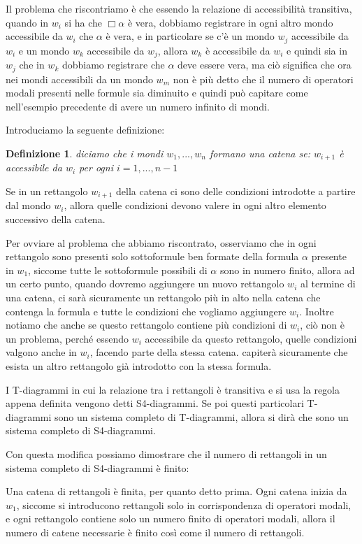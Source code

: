 \documentclass[a4paper, titlepage, 12pt]{report}
\newtheorem{definition}{Definizione}[chapter]
\begin{document}
Il problema che riscontriamo è che essendo la relazione di accessibilità transitiva,
quando in $w_i$ si ha che $\Box \alpha$ è vera, dobbiamo registrare in ogni altro mondo
accessibile da $w_i$ che $\alpha$ è vera, e in particolare se c'è un mondo $w_j$
accessibile da $w_i$ e un mondo $w_k$ accessibile da $w_j$, allora $w_k$ è accessibile
da $w_i$ e quindi sia in $w_j$ che in $w_k$ dobbiamo registrare che $\alpha$ deve essere vera,
ma ciò significa che ora nei mondi accessibili da un mondo $w_m$ non è più detto
che il numero di operatori modali presenti nelle formule sia diminuito e quindi
può capitare come nell'esempio precedente di avere un numero infinito di mondi.

Introduciamo la seguente definizione:
\begin{definition}
diciamo che i mondi $w_1, ..., w_n$ formano una catena se:
$w_{i+1}$ è accessibile da $w_i$ per ogni $i = 1, ..., n-1$
\end{definition}

Se in un rettangolo $w_{i+1}$ della catena ci sono delle condizioni introdotte
a partire dal mondo $w_i$, allora quelle condizioni devono valere
in ogni altro elemento successivo della catena.

Per ovviare al problema che abbiamo riscontrato, osserviamo che
in ogni rettangolo sono presenti solo
sottoformule ben formate della formula $\alpha$ presente in $w_1$,
siccome tutte le sottoformule possibili di $\alpha$ sono in numero finito,
allora ad un certo punto, quando dovremo aggiungere un nuovo rettangolo $w_i$
al termine di una catena, ci sarà sicuramente un rettangolo più in alto nella catena
che contenga la formula e tutte le condizioni che vogliamo aggiungere $w_i$.
Inoltre notiamo che anche se questo rettangolo contiene più condizioni di $w_i$,
ciò non è un problema, perché essendo $w_i$ accessibile da questo rettangolo,
quelle condizioni valgono anche in $w_i$, facendo parte della stessa catena.
capiterà sicuramente che esista un altro rettangolo già introdotto
con la stessa formula.

I T-diagrammi in cui la relazione tra i rettangoli è transitiva e si usa la regola
appena definita vengono detti S4-diagrammi. Se poi questi particolari T-diagrammi
sono un sistema completo di T-diagrammi, allora si dirà che sono un sistema
completo di S4-diagrammi.


Con questa modifica possiamo dimostrare che il numero di rettangoli in un sistema
completo di S4-diagrammi è finito:

Una catena di rettangoli è finita, per quanto detto prima.
Ogni catena inizia da $w_1$, siccome si introducono rettangoli
solo in corrispondenza di operatori modali, e ogni rettangolo contiene solo un numero finito
di operatori modali, allora il numero di catene necessarie è finito
così come il numero di rettangoli.
\end{document}
